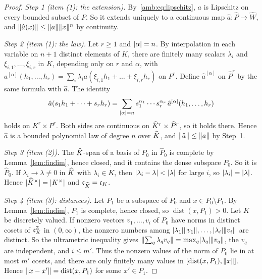 \begin{proof}
\emph{Step 1 (item (1): the extension).} By~\eqref{amb:eq:lipschitz}, $a$ is Lipschitz on every bounded subset of $P$. So
it extends uniquely to a continuous map $\hat a\colon\widehat P\to\widehat W$, and $\lVert \hat a(x)\rVert\le\lVert a\rVert\lVert x\rVert^n$ by
continuity.

\emph{Step 2 (item (1): the law).} Let $r\ge1$ and $\lvert \alpha\rvert=n$. By interpolation in each variable on $n+1$ distinct
elements of $K$, there are finitely many scalars $\lambda_i$ and $\xi_{i,1},\dots,\xi_{i,r}$ in $K$, depending only on $r$
and $\alpha$, with $a^{[\alpha]}(h_1,\dots,h_r)=\sum_i\lambda_ia(\xi_{i,1}h_1+\dots+\xi_{i,r}h_r)$ on $P^r$. Define
$\hat a^{[\alpha]}$ on $\widehat P^r$ by the same formula with $\hat a$. The identity
\[
 \hat a(s_1h_1+\dots+s_rh_r)=\sum_{\lvert \alpha\rvert=n}s_1^{\alpha_1}\cdots s_r^{\alpha_r}\,\hat a^{[\alpha]}(h_1,\dots,h_r)
\]
holds on $K^r\times P^r$. Both sides are continuous on $\widehat K^r\times\widehat P^r$, so it holds there. Hence $\hat a$ is a bounded polynomial law of degree $n$ over $\widehat K$, and $\lVert \hat a\rVert\le\lVert a\rVert$ by Step~1.

\emph{Step 3 (item (2)).} The $\widehat K$\nobreakdash-span of a basis of $P_0$ in $\widehat P_0$ is complete by
Lemma~\ref{lem:findim}, hence closed, and it contains the dense subspace $P_0$. So it is $\widehat P_0$. If
$\lambda_i\to\lambda\ne0$ in $\widehat K$ with $\lambda_i\in K$, then $\lvert \lambda_i-\lambda\rvert<\lvert \lambda\rvert$ for large $i$, so
$\lvert \lambda_i\rvert=\lvert \lambda\rvert$. Hence $\lvert \widehat K^\times\rvert=\lvert K^\times\rvert$ and $\mathfrak c_{\widehat K}=\mathfrak c_K$.

\emph{Step 4 (item (3): distances).} Let $P_1$ be a subspace of $P_0$ and $x\in P_0\setminus P_1$. By
Lemma~\ref{lem:findim}, $P_1$ is complete, hence closed, so $\operatorname{dist}(x,P_1)>0$. Let $K$ be discretely valued.
If nonzero vectors $v_1,\dots,v_i$ of $P_0$ have norms in distinct cosets of $\mathfrak c_K^{\mathbb Z}$ in $(0,\infty)$, the
nonzero numbers among $\lvert \lambda_1\rvert\lVert v_1\rVert,\dots,\lvert \lambda_i\rvert\lVert v_i\rVert$ are distinct. So the ultrametric
inequality gives $\lVert \sum_q\lambda_qv_q\rVert=\max_q\lvert \lambda_q\rvert\lVert v_q\rVert$, the $v_q$ are independent, and $i\le m'$.
Thus the nonzero values of the norm of $P_0$ lie in at most $m'$ cosets, and there are only finitely many values in
$[\operatorname{dist}(x,P_1),\lVert x\rVert]$. Hence $\lVert x-x'\rVert=\operatorname{dist}(x,P_1)$ for some $x'\in P_1$.


\end{proof}
